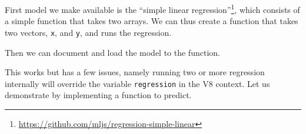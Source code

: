 \documentclass[
]{krantz}
\makeatletter
\newenvironment{Shaded}{\begin{snugshade}}{\end{snugshade}}
\newcommand{\CommentTok}[1]{\textcolor[rgb]{0.37,0.37,0.37}{\textit{#1}}}
\newcommand{\ControlFlowTok}[1]{\textcolor[rgb]{0.27,0.27,0.27}{\textbf{#1}}}
\newcommand{\KeywordTok}[1]{\textcolor[rgb]{0.27,0.27,0.27}{\textbf{#1}}}
\newcommand{\NormalTok}[1]{#1}
\newcommand{\OperatorTok}[1]{\textcolor[rgb]{0.43,0.43,0.43}{\textbf{#1}}}
\newcommand{\StringTok}[1]{\textcolor[rgb]{0.5,0.5,0.5}{#1}}
\renewcommand{\href}[2]{#2\footnote{\url{#1}}}
\newenvironment{kframe}{%
\medskip{}
\setlength{\fboxsep}{.8em}
 \def\at@end@of@kframe{}%
 \ifinner\ifhmode%
  \def\at@end@of@kframe{\end{minipage}}%
  \begin{minipage}{\columnwidth}%
 \fi\fi%
 \def\FrameCommand##1{\hskip\@totalleftmargin \hskip-\fboxsep
 \colorbox{shadecolor}{##1}\hskip-\fboxsep
     \hskip-\linewidth \hskip-\@totalleftmargin \hskip\columnwidth}%
 \MakeFramed {\advance\hsize-\width
   \@totalleftmargin\z@ \linewidth\hsize
   \@setminipage}}%
 {\par\unskip\endMakeFramed%
 \at@end@of@kframe}
\renewenvironment{Shaded}{\begin{kframe}}{\end{kframe}}
\makeatother
\begin{document}
First model we make available is the \href{https://github.com/mljs/regression-simple-linear}{``simple linear regression''}, which consists of a simple function that takes two arrays. We can thus create a function that takes two vectors, \texttt{x}, and \texttt{y}, and runs the regression.

\begin{Shaded}
\end{Shaded}

Then we can document and load the model to the function.

\begin{Shaded}
\end{Shaded}

This works but has a few issues, namely running two or more regression internally will override the variable \texttt{regression} in the V8 context. Let us demonstrate by implementing a function to predict.

\begin{Shaded}
\end{Shaded}
\end{document}
